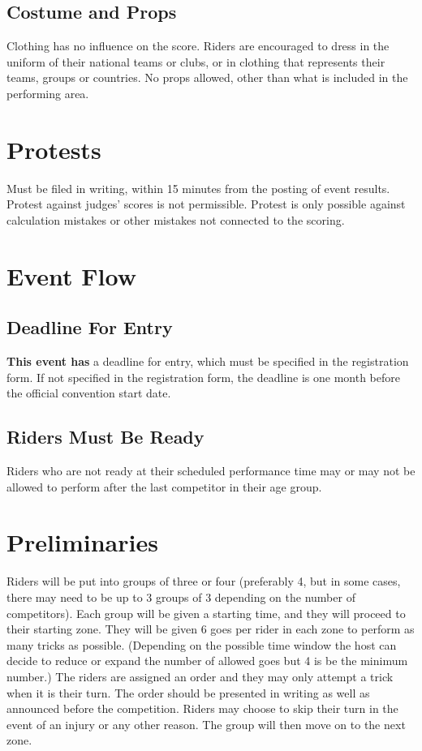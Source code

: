\subsection{Costume and Props}
Clothing has no influence on the score.
Riders are encouraged to dress in the uniform of their national teams or clubs, or in clothing that represents their teams, groups or countries.
No props allowed, other than what is included in the performing area.

\section{Protests}

Must be filed in writing, within 15 minutes from the posting of event results.
Protest against judges' scores is not permissible.
Protest is only possible against calculation mistakes or other mistakes not connected to the scoring.

\section{Event Flow}

\subsection{Deadline For Entry}

\textbf{This event has} a deadline for entry, which must be specified in the registration form.
If not specified in the registration form, the deadline is one month before the official convention start date.

\subsection{Riders Must Be Ready}

Riders who are not ready at their scheduled performance time may or may not be allowed to perform after the last competitor in their age group.

\section{Preliminaries}
Riders will be put into groups of three or four (preferably 4, but in some cases, there may need to be up to 3 groups of 3 depending on the number of competitors).
Each group will be given a starting time, and they will proceed to their starting zone.
They will be given 6 goes per rider in each zone to perform as many tricks as possible.
(Depending on the possible time window the host can decide to reduce or expand the number of allowed goes but 4 is be the minimum number.)
The riders are assigned an order and they may only attempt a trick when it is their turn.
The order should be presented in writing as well as announced before the competition.
Riders may choose to skip their turn in the event of an injury or any other reason.
The group will then move on to the next zone.

